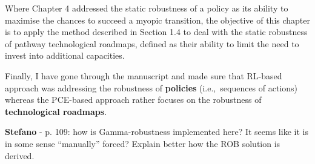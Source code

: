 \documentclass[12pt,a4paper]{article}
\def\ie{i.e.,\ }
\begin{document}
\begin{mdframed}[style=manuscript] %
Where Chapter 4 addressed the static robustness of a policy as its ability to maximise the chances to succeed a myopic transition, the objective of this chapter is to apply the method described in Section 1.4 to deal with the static robustness of pathway technological roadmaps, defined as their ability to limit the need to invest into additional capacities.
\end{mdframed}

Finally, I have gone through the manuscript and made sure that RL-based approach was addressing the robustness of \textbf{policies} (\ie sequences of actions) whereas the PCE-based approach rather focuses on the robustness of \textbf{technological roadmaps}. 


\begin{mdframed}[style=comment] %
{\color{orange} \textbf{Stefano}} - p. 109: how is Gamma-robustness implemented here? It seems like it is in some sense ``manually'' forced? Explain better how the ROB solution is derived.
\end{mdframed}
\end{document}
